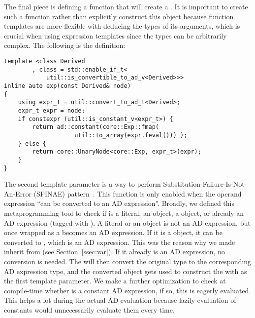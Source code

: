 The final piece is defining a function that will create a .
It is important to create such a function rather than explicitly
construct this  object because function templates
are more flexible with deducing the types of its arguments, 
which is crucial when using expression templates
since the types can be arbitrarily complex.
The following is the  definition:
\begin{lstlisting}[style=customcpp]
template <class Derived
        , class = std::enable_if_t<
            util::is_convertible_to_ad_v<Derived>>> 
inline auto exp(const Derived& node) 
{ 
    using expr_t = util::convert_to_ad_t<Derived>;
    expr_t expr = node;
    if constexpr (util::is_constant_v<expr_t>) { 
        return ad::constant(core::Exp::fmap(
                    util::to_array(expr.feval())) ); 
    } else { 
        return core::UnaryNode<core::Exp, expr_t>(expr); 
    } 
}
\end{lstlisting}
The second template parameter is a way to perform 
Substitution-Failure-Is-Not-An-Error (SFINAE) pattern~\cite{vandevoorde:2002}.
This function is only enabled when the operand expression 
``can be converted to an AD expression''.
Broadly, we defined this metaprogramming tool to check if 
 is a literal, an  object, 
a  object,
or already an AD expression (tagged with ).
A literal or an  object is not an AD expression,
but once wrapped as a  becomes an AD expression.
If it is a  object, it can be converted to , which is an AD expression.
This was the reason why we made  inherit from  (see Section~\ref{ssec:var}).
If it already is an AD expression, no conversion is needed.
The  will then convert the original type to the corresponding AD expression type,
and the converted object  gets used 
to construct the  with  as the first template parameter.
We make a further optimization to check at compile-time whether 
is a constant AD expression, if so, this is eagerly evaluated.
This helps a lot during the actual AD evaluation because 
lazily evaluation of constants would unnecessarily evaluate them every time.
